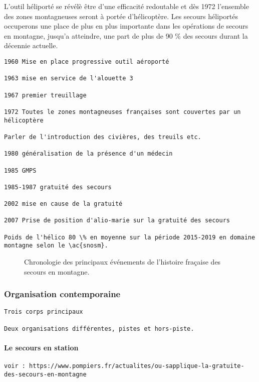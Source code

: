 L'outil héliporté se révélè être d'une efficacité redoutable et dès
1972 l'ensemble des zones montagneuses seront à portée
d'hélicoptère. Les secours héliportés occuperons une place de plus en
plus importante dans les opérations de secours en montagne, jusqu'a
atteindre, une part de plus de 90 \% des secours durant la décennie
actuelle.

\begin{verbatim}
1960 Mise en place progressive outil aéroporté

1963 mise en service de l'alouette 3

1967 premier treuillage

1972 Toutes le zones montagneuses françaises sont couvertes par un
hélicoptère

Parler de l'introduction des civières, des treuils etc.

1980 généralisation de la présence d'un médecin

1985 GMPS

1985-1987 gratuité des secours

2002 mise en cause de la gratuité

2007 Prise de position d'alio-marie sur la gratuité des secours

Poids de l'hélico 80 \% en moyenne sur la période 2015-2019 en domaine
montagne selon le \ac{snosm}.
\end{verbatim}

\begin{figure}
  \centering
   
   \caption{Chronologie des principaux événements de
     l'histoire fraçaise des secours en montagne.}
  \label{fig:frise_chronologique}
\end{figure}


\subsubsection{Organisation contemporaine}
\label{subsubsec:1-1-1-2}

\begin{verbatim}
Trois corps principaux

Deux organisations différentes, pistes et hors-piste.
\end{verbatim}


\paragraph{Le secours en station}

\begin{verbatim}
voir : https://www.pompiers.fr/actualites/ou-sapplique-la-gratuite-des-secours-en-montagne
\end{verbatim}


